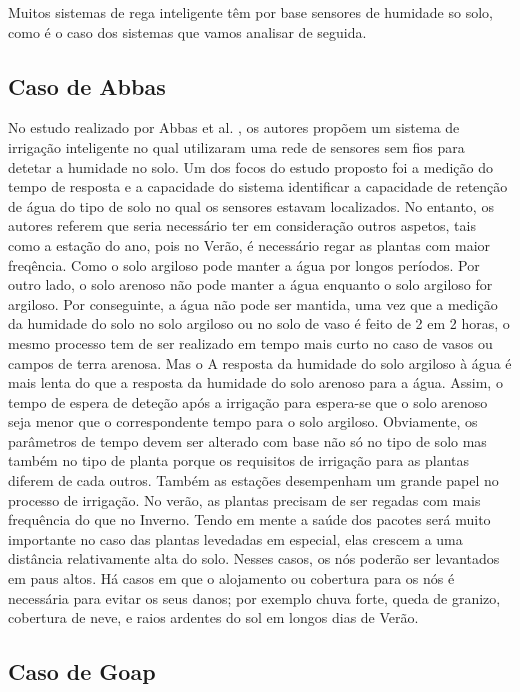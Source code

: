 \documentclass[conference]{IEEEtran}
\begin{document}
Muitos sistemas de rega inteligente têm por base sensores de humidade so solo, como 
é o caso dos sistemas que vamos analisar de seguida.

\subsection{Caso de Abbas}

No estudo realizado por Abbas et al. \cite{abbas2014smart}, os autores propõem 
um sistema de irrigação inteligente no qual utilizaram uma rede de sensores sem 
fios para detetar a humidade no solo. Um dos focos do estudo proposto foi a medição 
do tempo de resposta e a capacidade do sistema identificar a capacidade de 
retenção de água do tipo de solo no qual os sensores estavam localizados. 
No entanto, os autores referem que seria necessário ter em consideração outros 
aspetos, tais como a estação do ano, pois no Verão, é necessário regar as plantas 
com maior freqência.
Como o solo argiloso pode manter a água por longos períodos. Por outro lado, 
o solo arenoso não pode manter a água enquanto o solo argiloso for argiloso. 
Por conseguinte, a água não pode ser mantida, uma vez que a medição da 
humidade do solo no solo argiloso ou no solo de vaso é feito de 2 em 2 horas, 
o mesmo processo tem de ser realizado em tempo mais curto no caso de vasos 
ou campos de terra arenosa. Mas o A resposta da humidade do solo argiloso 
à água é mais lenta do que a resposta da humidade do solo arenoso para a água. 
Assim, o tempo de espera de deteção após a irrigação para espera-se que o solo 
arenoso seja menor que o correspondente tempo para o solo argiloso. Obviamente, 
os parâmetros de tempo devem ser alterado com base não só no tipo de solo mas 
também no tipo de planta porque os requisitos de irrigação para as plantas 
diferem de cada outros. Também as estações desempenham um grande papel no 
processo de irrigação. No verão, as plantas precisam de ser regadas com mais 
frequência do que no Inverno. Tendo em mente a saúde dos pacotes será muito 
importante no caso das plantas levedadas em especial, elas crescem a uma 
distância relativamente alta do solo. Nesses casos, os nós poderão ser 
levantados em paus altos. Há casos em que o alojamento ou cobertura 
para os nós é necessária para evitar os seus danos; por exemplo 
chuva forte, queda de granizo, cobertura de neve, e raios ardentes 
do sol em longos dias de Verão.

\subsection{Caso de Goap}
\end{document}
